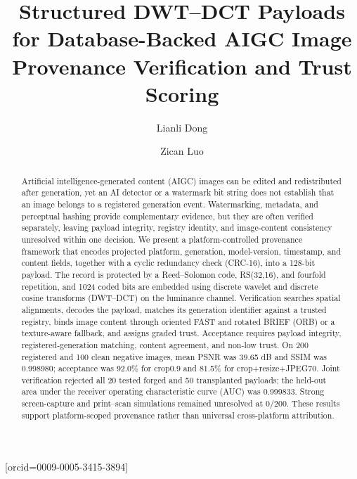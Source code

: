 \documentclass[a4paper,fleqn]{cas-sc}
\begin{document}
\let\WriteBookmarks\relax
\def\floatpagepagefraction{1}
\def\textpagefraction{.001}


\title[mode=title]{Structured DWT--DCT Payloads for Database-Backed AIGC Image
Provenance Verification and Trust Scoring}

\author[1]{Lianli Dong}[orcid=0009-0005-3415-3894]
\cormark[1]

\author[1]{Zican Luo}



\begin{abstract}
Artificial intelligence-generated content (AIGC) images can be edited and
redistributed after generation, yet an AI detector or a watermark bit string
does not establish that an image belongs to a registered generation event.
Watermarking, metadata, and perceptual hashing provide complementary evidence,
but they are often verified separately, leaving payload integrity, registry
identity, and image-content consistency unresolved within one decision. We
present a platform-controlled provenance framework that encodes projected
platform, generation, model-version, timestamp, and content fields, together
with a cyclic redundancy check (CRC-16), into a 128-bit payload. The record is
protected by a Reed--Solomon code, RS(32,16), and fourfold repetition, and 1024
coded bits are embedded using discrete wavelet and discrete cosine transforms
(DWT--DCT) on the luminance channel. Verification searches spatial alignments,
decodes the payload, matches its generation identifier against a trusted
registry, binds image content through oriented FAST and rotated BRIEF (ORB) or a
texture-aware fallback, and assigns graded trust. Acceptance requires payload
integrity, registered-generation matching, content agreement, and non-low
trust. On 200 registered and 100 clean negative images, mean PSNR was 39.65 dB
and SSIM was 0.998980; acceptance was 92.0\% for crop0.9 and 81.5\% for
crop+resize+JPEG70. Joint verification rejected all 20 tested forged and 50
transplanted payloads; the held-out area under the receiver operating
characteristic curve (AUC) was 0.999833. Strong screen-capture and print--scan
simulations remained unresolved at 0/200. These results support
platform-scoped provenance rather than universal cross-platform attribution.
\end{abstract}
\end{document}
